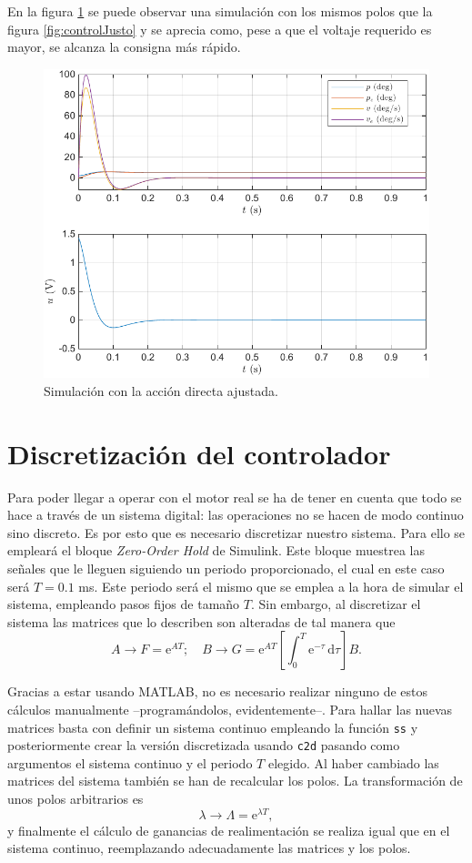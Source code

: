 \documentclass{article}
\newcommand{\diff}[0]{\mathrm{d}} %
\newcommand{\code}[1]{\colorbox{light-gray}{\texttt{#1}}}
\begin{document}
En la figura \ref{fig:accionDirecta} se puede observar una simulación con los mismos polos que la figura \ref{fig:controlJusto} y se aprecia como, pese a que el voltaje requerido es mayor, se alcanza la consigna más rápido.

\begin{figure}[H]
    \centering
    \includegraphics[width=0.75\linewidth]{img/accionDirecta.pdf}
    \caption{Simulación con la acción directa ajustada.}
    \label{fig:accionDirecta}
\end{figure}

\section{Discretización del controlador}

Para poder llegar a operar con el motor real se ha de tener en cuenta que todo se hace a través de un sistema digital: las operaciones no se hacen de modo continuo sino discreto. Es por esto que es necesario discretizar nuestro sistema. Para ello se empleará el bloque \textit{Zero-Order Hold} de Simulink. Este bloque muestrea las señales que le lleguen siguiendo un periodo proporcionado, el cual en este caso será $T = 0.1$ ms. Este periodo será el mismo que se emplea a la hora de simular el sistema, empleando pasos fijos de tamaño $T$. Sin embargo, al discretizar el sistema las matrices que lo describen son alteradas de tal manera que
\begin{equation}
    A \to F = \mathrm{e}^{AT};\quad B \to G = \mathrm{e}^{AT} \left[ \int^T_0 \mathrm{e}^{-\tau}\, \diff\tau \right] B.
\end{equation}

Gracias a estar usando MATLAB, no es necesario realizar ninguno de estos cálculos manualmente --programándolos, evidentemente--. Para hallar las nuevas matrices basta con definir un sistema continuo empleando la función \code{ss} y posteriormente crear la versión discretizada usando \code{c2d} pasando como argumentos el sistema continuo y el periodo $T$ elegido. Al haber cambiado las matrices del sistema también se han de recalcular los polos. La transformación de unos polos arbitrarios es 
\begin{equation}
    \lambda \to \Lambda = \mathrm{e}^{\lambda T},
\end{equation}
y finalmente el cálculo de ganancias de realimentación se realiza igual que en el sistema continuo, reemplazando adecuadamente las matrices y los polos.
\end{document}
